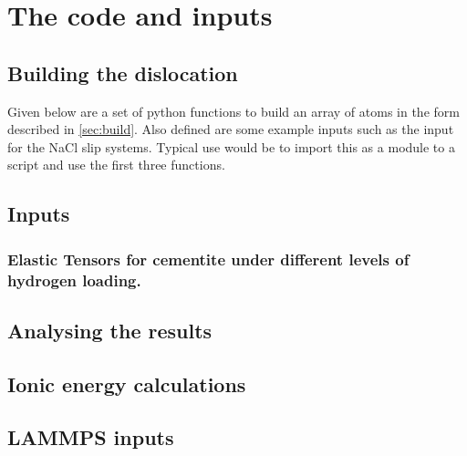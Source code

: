 \chapter{The code and inputs}

\section{Building the dislocation}
\label{sec:building_disloc_code}

Given below are a set of python functions to build an array of atoms in the form described in \autoref{sec:build}. Also defined are some example inputs such as the input for the NaCl slip systems.
 Typical use would be to import this as a module to a script and use the first three functions.
 
 


\section{Inputs}
\label{sec:pyerls_inputs}

\subsection{Elastic Tensors for cementite under different levels of hydrogen loading.}



\section{Analysing the results}
\label{sec:analysing_results_code}

\section{Ionic energy calculations}
\label{sec:ionic_energy_code}
%


\section{LAMMPS inputs}
\label{sec:lammps_input}
